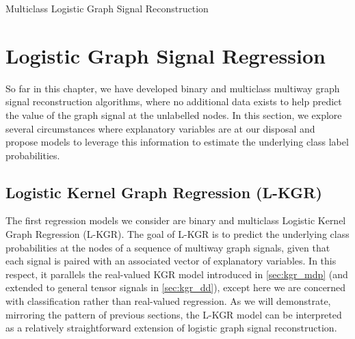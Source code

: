 \begin{algorithm}[ht]
\begin{algorithmic}
    \vspace{0.15cm}
    \vspace{0.15cm}
    \vspace{0.15cm}
    \vspace{0.15cm}
    \EndWhile
    \vspace{0.25cm}
    \vspace{0.15cm}
    \end{algorithmic}
    \caption{Multiclass Logistic Graph Signal Reconstruction}
    \label{al:LGSR_mc}
\end{algorithm}

\section{Logistic Graph Signal Regression} 

\label{sec:logistic_regression}

So far in this chapter, we have developed binary and multiclass multiway graph signal reconstruction algorithms, where no additional data exists to help predict the value of the graph signal at the unlabelled nodes. In this section, we explore several circumstances where explanatory variables are at our disposal and propose models to leverage this information to estimate the underlying class label probabilities.

\subsection{Logistic Kernel Graph Regression (L-KGR)}

\label{sec:lkgr}

The first regression models we consider are binary and multiclass Logistic Kernel Graph Regression (L-KGR). The goal of L-KGR is to predict the underlying class probabilities at the nodes of a sequence of multiway graph signals, given that each signal is paired with an associated vector of explanatory variables. In this respect, it parallels the real-valued KGR model introduced in \cref{sec:kgr_mdp} (and extended to general tensor signals in \cref{sec:kgr_dd}), except here we are concerned with classification rather than real-valued regression. As we will demonstrate, mirroring the pattern of previous sections, the L-KGR model can be interpreted as a relatively straightforward extension of logistic graph signal reconstruction. 

